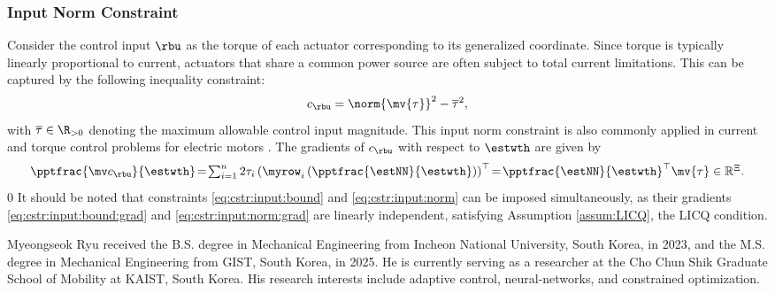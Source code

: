\documentclass[journal]{IEEEtran}
\newcommand*{\template}{template}
\begin{document}
\subsubsection{Input Norm Constraint}\label{sec:appen:cstr:input:norm}

Consider the control input $\rbu$ as the torque of each actuator corresponding to its generalized coordinate. 
Since torque is typically linearly proportional to current, actuators that share a common power source are often subject to total current limitations. This can be captured by the following inequality constraint: 
\begin{equation}
    c_{\rbu}
    =
    \norm{
        \mv{\tau}
    }^2 
    -
    \overline\tau^2
    ,
    \label{eq:cstr:input:norm}
\end{equation}
with $\overline\tau\in\R_{>0}$ denoting the maximum allowable control input magnitude. This input norm constraint is also commonly applied in current and torque control problems for electric motors \cite{Choi:2024aa}.
The gradients of $c_{\rbu}$ with respect to $\estwth$ are given by
\begin{equation}
    \pptfrac{\mv c_{\rbu}}{\estwth}
    \!=\! 
    \textstyle\sum_{i=1}^n 2\tau_{i} 
    \left(
        \myrow_i
        \left(
            \pptfrac{\estNN}{\estwth}
        \right)
    \right)^\top  
    \!=\! 
    {\pptfrac{\estNN}{\estwth}}^\top
    \mv{\tau}
    \in \mathbb R^{\Xi}.
    \label{eq:cstr:input:norm:grad}
\end{equation}0
It should be noted that constraints \eqref{eq:cstr:input:bound} and \eqref{eq:cstr:input:norm} can be imposed simultaneously, as their gradients \eqref{eq:cstr:input:bound:grad} and \eqref{eq:cstr:input:norm:grad} are linearly independent, satisfying Assumption \ref{assum:LICQ}, \ie the LICQ condition.




\begin{IEEEbiography}{Myeongseok Ryu}
    received the B.S. degree in Mechanical Engineering from Incheon National University, South Korea, in 2023, and the M.S. degree in Mechanical Engineering from GIST, South Korea, in 2025. 
    He is currently serving as a researcher at the Cho Chun Shik Graduate School of Mobility at KAIST, South Korea.
    His research interests include adaptive control, neural-networks, and constrained optimization.
\end{IEEEbiography}
\end{document}

